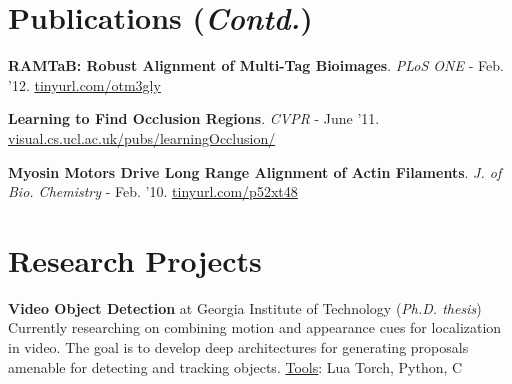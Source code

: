 \documentclass[10pt,twoside,a4paper]{article}
\newif\ifdetail
\newcommand\CPP{C\nolinebreak[4]\hspace{-.05em}\raisebox{.4ex}{\relsize{-3}{\textbf{++}}}}
\begin{document}
\section{Publications {\small(\textit{Contd.})}}
{
\small
\fi

\textbf{RAMTaB: Robust Alignment of Multi-Tag Bioimages}. \ifdetail ($2^{\text{nd}}$ author) \newline \fi \textit{PLoS ONE} - Feb. '12. \href{http://journals.plos.org/plosone/article?id=10.1371/journal.pone.0030894}{\ifdetail journals.plos.org/plosone/article?id=10.1371/journal.pone.0030894 \else tinyurl.com/otm3gly \fi}

\ifdetail
\textbf{A Framework for Molecular Co-Expression Pattern Analysis \newline in Multi-Channel Toponome Fluorescence Images}. ($1^{\text{st}}$ author) \newline \textit{Microscopy Image Analysis with Apps. in Biology (MIAAB)} - Sept. '11. \href{http://ahumayun.com/pubs/humayun_MIAAB_2011_coexpressiontis.pdf}{ahumayun.com/pubs/coexprstis11} %
\fi

\ifdetail
\textbf{Towards Protein Network Analysis Using TIS Imaging and Exploratory Data Analysis}. ($3^{\text{rd}}$ author) \newline \textit{Workshop on Computational Systems Biology (WCSB)} - June '11. \href{http://ahumayun.com/pubs/langenkamper_WCSB_2011_tisdataanalysis.pdf}{ahumayun.com/pubs/tisdata11} %
\fi

\textbf{Learning to Find Occlusion Regions}. \ifdetail ($1^{\text{st}}$ author) \newline \fi \textit{\ifdetail IEEE Conference on Computer Vision and Pattern Recognition (CVPR) \else CVPR \fi} - June '11. \href{http://visual.cs.ucl.ac.uk/pubs/learningOcclusion/}{visual.cs.ucl.ac.uk/pubs/learningOcclusion/}

\textbf{Myosin Motors Drive Long Range Alignment of Actin Filaments}. \ifdetail ($3^{\text{rd}}$ author) \newline \fi \textit{\ifdetail Journal of Biological Chemistry \else J. of Bio. Chemistry \fi} - Feb. '10. \href{http://www.jbc.org/content/285/7/4964.abstract}{\ifdetail www.jbc.org/content/285/7/4964.abstract \else tinyurl.com/p52xt48 \fi}
}

\ifdetail
\else
\vspace{-0.4cm}
\fi


\section{Research Projects}
\textbf{Video Object Detection} at Georgia Institute of Technology (\textit{Ph.D. thesis}) \newline
Currently researching on combining motion and appearance cues for localization in video. The goal is to develop deep architectures for generating proposals amenable for detecting and tracking objects. \underline{Tools}: Lua Torch, Python, \CPP
\end{document}
